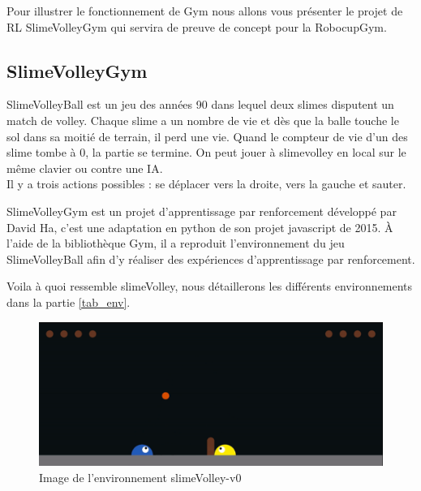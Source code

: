 \documentclass[11pt, a4paper]{article}
\begin{document}
	Pour illustrer le fonctionnement de Gym nous allons vous présenter le projet de RL SlimeVolleyGym qui servira de preuve de concept pour la RobocupGym.

	\subsection{SlimeVolleyGym}

	SlimeVolleyBall est un jeu des années 90 dans lequel deux slimes disputent un match de volley. Chaque slime a un nombre de vie et dès que la balle touche le sol dans sa moitié de terrain, il perd une vie. Quand le compteur de vie d'un des slime tombe à 0, la partie se termine. On peut jouer à slimevolley en local sur le même clavier ou contre une IA.\\
	Il y a trois actions possibles : se déplacer vers la droite, vers la gauche et sauter.

	\vspace{0.5cm}

	SlimeVolleyGym \cite{slimevolleygym} est un projet d'apprentissage par renforcement développé par David Ha, c'est une adaptation en python de son projet javascript \cite{ha2015slimevolley} de 2015.
	À l'aide de la bibliothèque Gym, il a reproduit l'environnement du jeu SlimeVolleyBall afin d'y réaliser des expériences d'apprentissage par renforcement.

	Voila à quoi ressemble slimeVolley, nous détaillerons les différents environnements dans la partie \ref{tab_env}.
	\begin{figure}[H]
		\centering
		\includegraphics[scale=0.5]{images/slimeVolley.PNG}
		\caption {Image de l'environnement slimeVolley-v0  \cite{slimevolleygym}}
	\end{figure}
\end{document}
